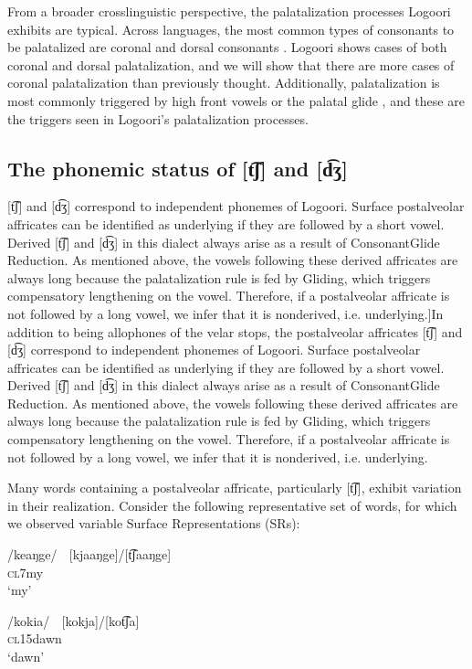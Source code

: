 \documentclass[output=paper]{langsci/langscibook}
\begin{document}
From a broader crosslinguistic perspective, the palatalization processes Logoori exhibits are typical. Across languages, the most common types of consonants to be palatalized are coronal and dorsal consonants \citep{Bateman2011}. Logoori shows cases of both coronal and dorsal palatalization, and we will show that there are more cases of coronal palatalization than previously thought. Additionally, palatalization is most commonly triggered by high front vowels or the palatal glide \citep{Bateman2011}, and these are the triggers seen in Logoori’s palatalization processes.

\subsection{The phonemic status of [t͡ʃ] and [d͡ʒ]} %
[t͡ʃ] and [d͡ʒ{]} correspond to independent phonemes of Logoori. Surface postalveolar affricates can be identified as underlying if they are followed by a short vowel. Derived [t͡ʃ{]} and [d͡ʒ{]} in this dialect always arise as a result of ConsonantGlide Reduction. As mentioned above, the vowels following these derived affricates are always long because the palatalization rule is fed by Gliding, which triggers compensatory lengthening on the vowel. Therefore, if a postalveolar affricate is not followed by a long vowel, we infer that it is nonderived, i.e. underlying.]{\textmd{In addition to being allophones of the velar stops, the postalveolar affricates [t͡ʃ] and [d͡ʒ] correspond to independent phonemes of Logoori. Surface postalveolar affricates can be identified as underlying if they are followed by a short vowel. Derived [t͡ʃ] and [d͡ʒ] in this dialect always arise as a result of ConsonantGlide Reduction. As mentioned above, the vowels following these derived affricates are always long because the palatalization rule is fed by Gliding, which triggers compensatory lengthening on the vowel. Therefore, if a postalveolar affricate is not followed by a long vowel, we infer that it is nonderived, i.e. underlying.}}

Many words containing a postalveolar affricate, particularly [t͡ʃ], exhibit variation in their realization. Consider the following representative set of words, for which we observed variable Surface Representations (SRs): 


\ea{}
 /keaŋge/    [kjaaŋge]/[t͡ʃaaŋge]\\{}
\textsc{cl7}my\\{}
\glt ‘my’
\z

\ea{}
 /kokia/      [kokja]/[kot͡ʃa]\\{}
\textsc{cl15}dawn\\{}
\glt ‘dawn’
\z
\end{document}
